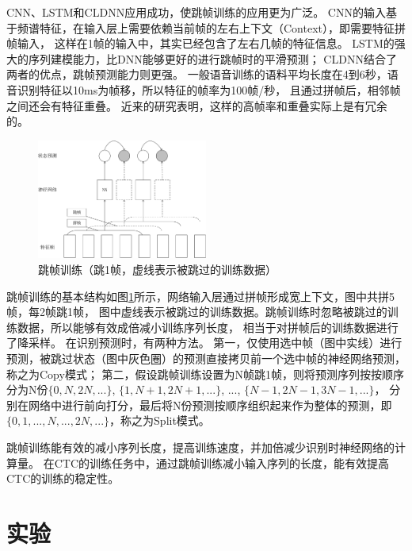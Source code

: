 CNN、LSTM和CLDNN应用成功，使跳帧训练的应用更为广泛。
CNN的输入基于频谱特征，在输入层上需要依赖当前帧的左右上下文（Context），即需要特征拼帧输入，
这样在1帧的输入中，其实已经包含了左右几帧的特征信息。
LSTM的强大的序列建模能力，比DNN能够更好的进行跳帧时的平滑预测；
CLDNN结合了两者的优点，跳帧预测能力则更强。
一般语音训练的语料平均长度在4到6秒，语音识别特征以10ms为帧移，所以特征的帧率为100帧/秒，
且通过拼帧后，相邻帧之间还会有特征重叠。
近来的研究表明，这样的高帧率和重叠实际上是有冗余的。

\begin{figure}
\centering
\includegraphics[width=0.5\textwidth]{figures/chapter3/skip-crop}
\caption{跳帧训练（跳1帧，虚线表示被跳过的训练数据）}
\label{fig:skip}
\end{figure}


跳帧训练的基本结构如图\ref{fig:skip}所示，网络输入层通过拼帧形成宽上下文，图中共拼5帧，每2帧跳1帧，
图中虚线表示被跳过的训练数据。跳帧训练时忽略被跳过的训练数据，所以能够有效成倍减小训练序列长度，
相当于对拼帧后的训练数据进行了降采样。
在识别预测时，有两种方法。
第一，仅使用选中帧（图中实线）进行预测，被跳过状态（图中灰色圈）的预测直接拷贝前一个选中帧的神经网络预测，称之为Copy模式；
第二，假设跳帧训练设置为N帧跳1帧，则将预测序列按按顺序分为N份$\{0, N, 2N, ...\}$, $\{1, N+1, 2N+1, ...\}$, ..., $\{N-1, 2N-1, 3N-1, ...\}$，
分别在网络中进行前向打分，最后将N份预测按顺序组织起来作为整体的预测，即$\{0, 1, ..., N, ..., 2N, ...\}$，称之为Split模式。


跳帧训练能有效的减小序列长度，提高训练速度，并加倍减少识别时神经网络的计算量。
在CTC的训练任务中，通过跳帧训练减小输入序列的长度，能有效提高CTC的训练的稳定性。

\section{实验} 